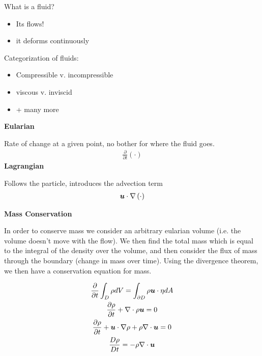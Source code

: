 \documentclass{article}
\begin{document}
What is a fluid?
\begin{itemize}
    \item Its flows! 
    \item it deforms continuously
\end{itemize}

Categorization of fluids:
\begin{itemize}
    \item Compressible v. incompressible
    \item viscous v. inviscid
    \item + many more
\end{itemize}

\vspace{20pt}

    \centering
    {\Large \textbf{Eularian}}
    \vspace{5pt}

    Rate of change at a given point, no bother for where the fluid goes. 
    \begin{gather*}
        \frac{\partial}{\partial t}\left(\cdot\right) 
    \end{gather*}
\emp
\hspace{5pt}
    \centering
    {\Large \textbf{Lagrangian}}
    \vspace{5pt}

    Follows the particle, introduces the advection term
    \begin{gather*}
        \boldsymbol{u}\cdot\nabla \left(\cdot\right)
    \end{gather*}
\emp

\vspace{20pt}
{\Large \textbf{Mass Conservation}}
\vspace{5pt}


In order to conserve mass we consider an arbitrary eularian volume (i.e. the
volume doesn't move with the flow). We then find the total mass which is equal
to the integral of the density over the volume, and then consider the flux of
mass through the boundary (change in mass over time). Using the divergence
theorem, we then have a conservation equation for mass. 

\begin{gather*}
    \frac{\partial }{\partial t}\int_D\rho dV = \int_{\partial D} \rho\boldsymbol{u} \cdot \eta dA\\
    \frac{\partial \rho}{\partial t} + \nabla\cdot \rho\boldsymbol{u} = 0 \\
    \frac{\partial \rho}{\partial t} + \boldsymbol{u}\cdot\nabla\rho + \rho\nabla\cdot\boldsymbol{u} = 0\\
    \frac{D\rho}{Dt} = - \rho \nabla\cdot\boldsymbol{u}
\end{gather*}
\end{document}
